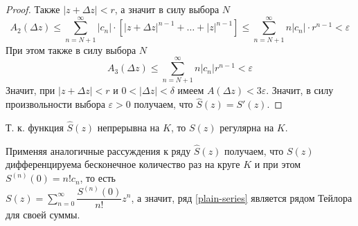 \begin{proof}
Также \(|z + \Delta z| < r\), а значит в силу выбора \(N\)
\[A_2(\Delta z) \leqslant \sum\limits_{n=N+1}^\infty |c_n| \cdot \left[|z + \Delta z|^{n-1} + \ldots + |z|^{n-1} \right] \leqslant \sum\limits_{n=N+1}^\infty n |c_n| \cdot r^{n-1} < \varepsilon\]
При этом также в силу выбора \(N\)
\[A_3(\Delta z) \leqslant \sum\limits_{n=N+1}^\infty n|c_n|r^{n-1} < \varepsilon\]
Значит, при \(|z + \Delta z| < r\) и \(0 < |\Delta z| < \delta\) имеем \(A(\Delta z) < 3 \varepsilon\). Значит, в силу произвольности выбора \(\varepsilon > 0\) получаем, что \(\widehat{S}(z) = S'(z)\).
\end{proof}

\begin{corollary}
    Т. к. функция \(\widehat{S}(z)\) непрерывна на \(K\), то \(S(z)\) регулярна на \(K\).
\end{corollary}

\begin{corollary}
    Применяя аналогичные рассуждения к ряду \(\widehat{S}(z)\) получаем, что \(S(z)\) дифференцируема бесконечное количество раз на круге \(K\) и при этом \(S^{(n)}(0) = n! c_n\), то есть \\
    \(S(z) = \sum\limits_{n=0}^\infty \dfrac{S^{(n)}(0)}{n!}z^n \), а значит, ряд \ref{plain-series} является рядом Тейлора для своей суммы.
\end{corollary}




